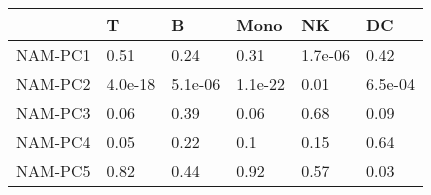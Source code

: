 \begin{tabular}{llllll}
\toprule
{} &        T &        B &     Mono &       NK &       DC \\
\midrule
NAM-PC1 &     0.51 &     0.24 &     0.31 &  1.7e-06 &     0.42 \\
NAM-PC2 &  4.0e-18 &  5.1e-06 &  1.1e-22 &     0.01 &  6.5e-04 \\
NAM-PC3 &     0.06 &     0.39 &     0.06 &     0.68 &     0.09 \\
NAM-PC4 &     0.05 &     0.22 &      0.1 &     0.15 &     0.64 \\
NAM-PC5 &     0.82 &     0.44 &     0.92 &     0.57 &     0.03 \\
\bottomrule
\end{tabular}
